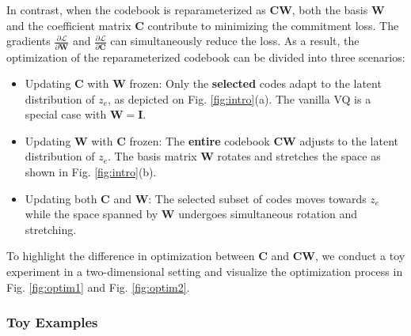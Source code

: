 In contrast, when the codebook is reparameterized as $\bm{C}\bm{W}$, both the basis $\bm{W}$ and the coefficient matrix $\bm{C}$ contribute to minimizing the commitment loss. The gradients $\frac{\partial \mathcal{L}}{\partial \bm{W}}$ and $\frac{\partial \mathcal{L}}{\partial \bm{C}}$ can simultaneously reduce the loss. As a result, the optimization of the reparameterized codebook can be divided into three scenarios:
\begin{itemize}
\item Updating $\bm{C}$ with $\bm{W}$ frozen: Only the \textbf{selected} codes adapt to the latent distribution of $z_e$, as depicted on Fig. \ref{fig:intro}(a). The vanilla VQ is a special case with $\bm{W}=\bm{I}$.
\item Updating $\bm{W}$ with $\bm{C}$ frozen: The \textbf{entire} codebook $\bm{C}\bm{W}$ adjusts to the latent distribution of $z_e$. The basis matrix $\bm{W}$ rotates and stretches the space as shown in Fig. \ref{fig:intro}(b).
\item Updating both $\bm{C}$ and $\bm{W}$: The selected subset of codes moves towards $z_e$ while the space spanned by $\bm{W}$ undergoes simultaneous rotation and stretching.
\end{itemize}

To highlight the difference in optimization between $\bm{C}$ and $\bm{CW}$, we conduct a toy experiment in a two-dimensional setting and visualize the optimization process in Fig. \ref{fig:optim1} and Fig. \ref{fig:optim2}. 

\subsubsection{Toy Examples}


